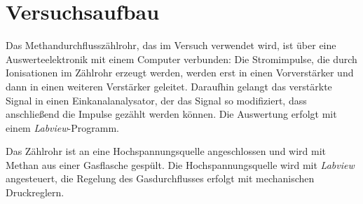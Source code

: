 \section{Versuchsaufbau}

Das Methandurchflusszählrohr, das im Versuch verwendet wird, ist über eine Auswerteelektronik mit
einem Computer verbunden: Die Stromimpulse, die durch Ionisationen im Zählrohr erzeugt werden, 
werden erst in einen Vorverstärker und dann in einen weiteren Verstärker geleitet.
Daraufhin gelangt das verstärkte Signal in einen Einkanalanalysator, der das Signal so modifiziert,
dass anschließend die Impulse gezählt werden können. Die Auswertung erfolgt mit einem
\textit{Labview}-Programm.

Das Zählrohr ist an eine Hochspannungsquelle angeschlossen und wird mit Methan aus einer Gasflasche gespült.
Die Hochspannungsquelle wird mit \textit{Labview} angesteuert, die Regelung des Gasdurchflusses erfolgt mit
mechanischen Druckreglern.